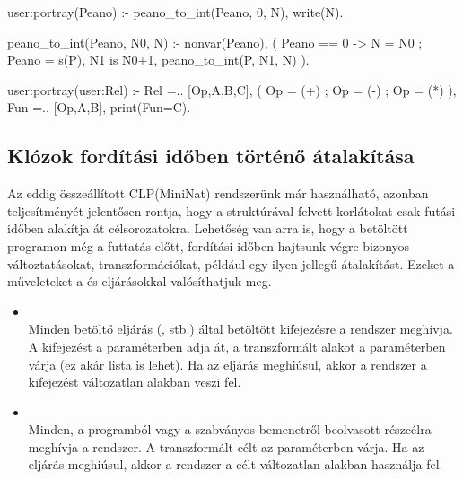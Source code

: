 \begin{prologcode}
user:portray(Peano) :-
        peano_to_int(Peano, 0, N), write(N).

peano_to_int(Peano, N0, N) :-
        nonvar(Peano),
        (   Peano == 0 -> N = N0
        ;   Peano = s(P), 
            N1 is N0+1,
            peano_to_int(P, N1, N)
        ).

user:portray(user:Rel) :-
        Rel =.. [Op,A,B,C],
        (   Op = (+) ; Op = (-) ; Op = (*) ),
        Fun =.. [Op,A,B],
        print({Fun=C}).
\end{prologcode}

\subsection{Klózok fordítási időben történő átalakítása}

Az eddig összeállított CLP(MiniNat) rendszerünk már használható, azonban
teljesítményét jelentősen rontja, hogy a  struktúrával felvett
korlátokat csak futási időben alakítja át célsorozatokra. Lehetőség van
arra is, hogy a betöltött programon még a futtatás előtt, fordítási időben
hajtsunk végre bizonyos változtatásokat, transzformációkat, például egy
ilyen jellegű átalakítást. Ezeket a műveleteket a  és
 eljárásokkal valósíthatjuk meg.

\begin{itemize}
\item {} \\
      Minden betöltő eljárás (,  stb.) által
      betöltött kifejezésre a rendszer meghívja. A kifejezést a 
      paraméterben adja át, a transzformált alakot a  paraméterben
      várja (ez akár lista is lehet). Ha az eljárás meghiúsul, akkor a rendszer
      a kifejezést változatlan alakban veszi fel.

\item {} \\
      Minden, a programból vagy a szabványos bemenetről beolvasott részcélra
      meghívja a rendszer. A transzformált célt az  paraméterben
      várja. Ha az eljárás meghiúsul, akkor a rendszer a célt változatlan
      alakban használja fel.
\end{itemize}

